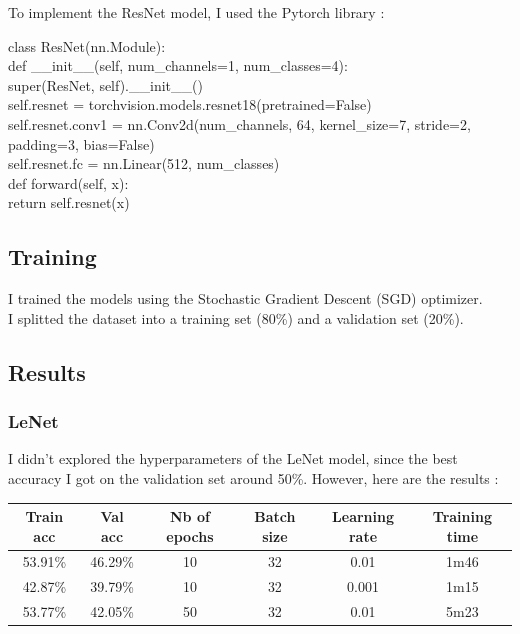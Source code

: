 \documentclass[12pt,a4paper]{article}
\newcommand{\code}[1]{%
    \begin{tcolorbox}[colback=black!10!white,colframe=black]
        #1
    \end{tcolorbox}
}
\begin{document}
To implement the ResNet model, I used the Pytorch library :

\code{
    class ResNet(nn.Module):\\
    \indent\qquad def \_\_init\_\_(self, num\_channels=1, num\_classes=4): \\
    \indent\qquad \qquad super(ResNet, self).\_\_init\_\_() \\
    \indent\qquad \qquad self.resnet = torchvision.models.resnet18(pretrained=False) \\
    \indent\qquad \qquad self.resnet.conv1 = nn.Conv2d(num\_channels, 64, kernel\_size=7, stride=2, padding=3, bias=False) \\
    \indent\qquad \qquad self.resnet.fc = nn.Linear(512, num\_classes) \\
    
    \indent\qquad def forward(self, x): \\
    \indent\qquad \qquad return self.resnet(x)
}

\subsection{Training}

I trained the models using the Stochastic Gradient Descent (SGD) optimizer. \\
I splitted the dataset into a training set (80\%) and a validation set (20\%).


\subsection{Results}

\subsubsection{LeNet}

I didn't explored the hyperparameters of the LeNet model, since the best accuracy I got on the validation set around 50\%.
However, here are the results :\\

\begin{tabular}{|c|c|c|c|c|c|}
    \hline
    \textbf{Train acc} & \textbf{Val acc} & \textbf{Nb of epochs} & \textbf{Batch size} & \textbf{Learning rate} & \textbf{Training time} \\
    \hline
    53.91\% & 46.29\% & 10 & 32 & 0.01 & 1m46 \\
    \hline
    42.87\% & 39.79\% & 10 & 32 & 0.001 & 1m15 \\
    \hline
    53.77\% & 42.05\% & 50 & 32 & 0.01 & 5m23 \\
    \hline
\end{tabular}\\
\end{document}
